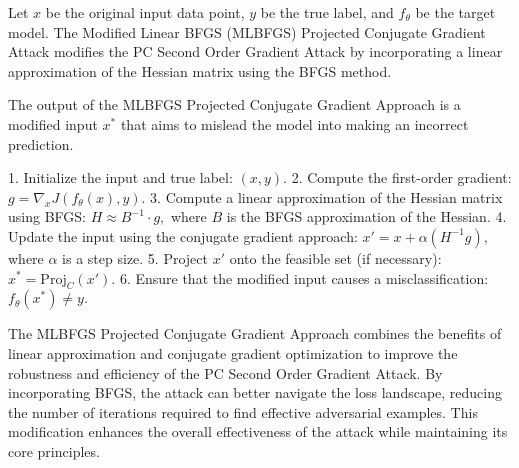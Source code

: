 Let \( x \) be the original input data point, \( y \) be the true label, and \( f_{\theta} \) be the target model. The Modified Linear BFGS (MLBFGS) Projected Conjugate Gradient Attack modifies the PC Second Order Gradient Attack by incorporating a linear approximation of the Hessian matrix using the BFGS method.

The output of the MLBFGS Projected Conjugate Gradient Approach is a modified input \( x^* \) that aims to mislead the model into making an incorrect prediction.

1. Initialize the input and true label:
   $
   (x, y).
   $
2. Compute the first-order gradient:
   $
   g = \nabla_x J(f_{\theta}(x), y).
   $
3. Compute a linear approximation of the Hessian matrix using BFGS:
   $
   H \approx B^{-1} \cdot g,
   $
   where \( B \) is the BFGS approximation of the Hessian.
4. Update the input using the conjugate gradient approach:
   $
   x' = x + \alpha (H^{-1} g),
   $
   where \( \alpha \) is a step size.
5. Project \( x' \) onto the feasible set (if necessary):
   $
   x^* = \text{Proj}_C(x').
   $
6. Ensure that the modified input causes a misclassification:
   $
   f_{\theta}(x^*) \neq y.
   $

The MLBFGS Projected Conjugate Gradient Approach combines the benefits of linear approximation and conjugate gradient optimization to improve the robustness and efficiency of the PC Second Order Gradient Attack. By incorporating BFGS, the attack can better navigate the loss landscape, reducing the number of iterations required to find effective adversarial examples. This modification enhances the overall effectiveness of the attack while maintaining its core principles.